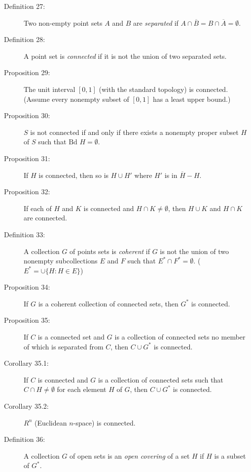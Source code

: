 \documentclass{article}
\begin{document}
\begin{description}
  \item[Definition 27:] Two non-empty point sets $A$ and $B$ are \emph{separated} if $A \cap \overline{B} = B \cap \overline{A} = \emptyset$.

  \item[Definition 28:] A point set is \emph{connected} if it is not the union of two separated sets.

  \item[Proposition 29:] The unit interval $[0,1]$ (with the standard topology) is connected. (Assume every nonempty subset of $[0,1]$ has a least upper bound.)

  \item[Proposition 30:] $S$ is not connected if and only if there exists a nonempty proper subset $H$ of $S$ such that $\text{Bd } H = \emptyset$.

  \item[Proposition 31:] If $H$ is connected, then so is $H \cup H'$ where $H'$ is in $\overline{H} - H$.

  \item[Proposition 32:] If each of $H$ and $K$ is connected and $H \cap K \neq \emptyset$, then $H \cup K$ and $H \cap K$ are connected.

  \item[Definition 33:] A collection $G$ of points sets is \emph{coherent} if $G$ is not the union of two nonempty subcollections $E$ and $F$ such that $E^* \cap F^* = \emptyset$. ($E^* = \cup \{ H: H \in E \}$)

  \item[Proposition 34:] If $G$ is a coherent collection of connected sets, then $G^*$ is connected.

  \item[Proposition 35:] If $C$ is a connected set and $G$ is a collection of connected sets no member of which is separated from $C$, then $C \cup G^*$ is connected.

  \item[Corollary 35.1:] If $C$ is connected and $G$ is a collection of connected sets such that $C \cap H \neq \emptyset$ for each element $H$ of $G$, then $C \cup G^*$ is connected.

  \item[Corollary 35.2:] $R^n$ (Euclidean $n$-space) is connected.

  \item[Definition 36:] A collection $G$ of open sets is an \emph{open covering} of a set $H$ if $H$ is a subset of $G^*$.


\end{description}
\end{document}

